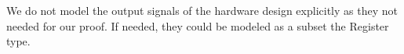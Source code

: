 We do not model the output signals of the hardware design explicitly as they not needed
for our proof. If needed, they could be modeled as a subset the \textsf{Register} type.




